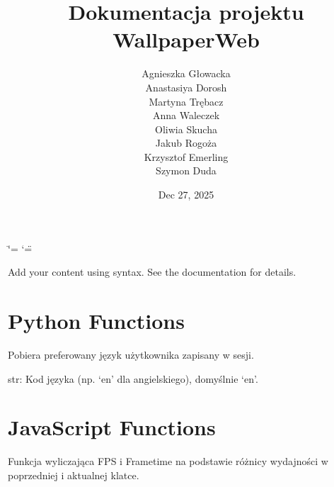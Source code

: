 \documentclass[a4paper,10pt,openany,english]{sphinxmanual}
\title{Dokumentacja projektu WallpaperWeb}
\date{Dec 27, 2025}
\author{Agnieszka Głowacka \\ Anastasiya Dorosh \\ Martyna Trębacz \\ Anna Waleczek \\ Oliwia Skucha \\ Jakub Rogoża \\ Krzysztof Emerling \\ Szymon Duda}
\begin{document}
\ifdefined\shorthandoff
  \ifnum\catcode`\=\string=\active\shorthandoff{=}\fi
  \ifnum\catcode`\"=\active{}\fi
\fi

\pagestyle{empty}
\sphinxmaketitle
\pagestyle{plain}
\sphinxtableofcontents
\pagestyle{normal}
\label{\detokenize{index::doc}}


\sphinxAtStartPar
Add your content using  syntax. See the
documentation for details.

\sphinxstepscope


\chapter{Python Functions}
\label{\detokenize{python/python-functions:python-functions}}\label{\detokenize{python/python-functions::doc}}

\begin{fulllineitems}
\label{\detokenize{python/python-functions:app.get_locale}}
\pysigstartsignatures
\pysiglinewithargsret
{}
{}
{}
\pysigstopsignatures
\sphinxAtStartPar
Pobiera preferowany język użytkownika zapisany w sesji.
\begin{description}
\sphinxAtStartPar
str: Kod języka (np. ‘en’ dla angielskiego), domyślnie ‘en’.

\end{description}

\end{fulllineitems}


\sphinxstepscope


\chapter{JavaScript Functions}
\label{\detokenize{js/js-functions:javascript-functions}}\label{\detokenize{js/js-functions::doc}}

\begin{fulllineitems}
\label{\detokenize{js/js-functions:updateStats}}
\pysigstartsignatures
\pysiglinewithargsret
{}
{}
{}
\pysigstopsignatures
\sphinxAtStartPar
Funkcja wyliczająca FPS i Frametime na podstawie różnicy wydajności w poprzedniej i aktualnej klatce.

\end{fulllineitems}
\end{document}
